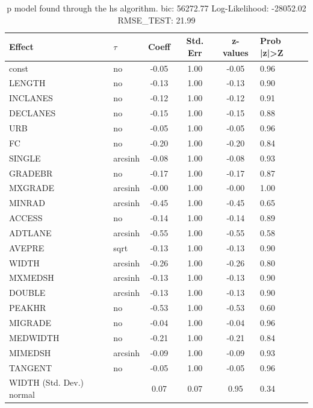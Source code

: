 \begin{table}
	\caption{p model found through the hs algorithm. bic: 56272.77 Log-Likelihood: -28052.02 RMSE_TEST: 21.99}
	\begin{center}
		\begin{tabular}{|l|l|c|c|c|l|}
			\hline
			Effect & $\tau$ & Coeff & Std. Err & z-values & Prob |z|>Z \\
			\hline
			const & no & -0.05 & 1.00 & -0.05 & 0.96 \\
			\hline
			LENGTH & no & -0.13 & 1.00 & -0.13 & 0.90 \\
			\hline
			INCLANES & no & -0.12 & 1.00 & -0.12 & 0.91 \\
			\hline
			DECLANES & no & -0.15 & 1.00 & -0.15 & 0.88 \\
			\hline
			URB & no & -0.05 & 1.00 & -0.05 & 0.96 \\
			\hline
			FC & no & -0.20 & 1.00 & -0.20 & 0.84 \\
			\hline
			SINGLE & arcsinh & -0.08 & 1.00 & -0.08 & 0.93 \\
			\hline
			GRADEBR & no & -0.17 & 1.00 & -0.17 & 0.87 \\
			\hline
			MXGRADE & arcsinh & -0.00 & 1.00 & -0.00 & 1.00 \\
			\hline
			MINRAD & arcsinh & -0.45 & 1.00 & -0.45 & 0.65 \\
			\hline
			ACCESS & no & -0.14 & 1.00 & -0.14 & 0.89 \\
			\hline
			ADTLANE & arcsinh & -0.55 & 1.00 & -0.55 & 0.58 \\
			\hline
			AVEPRE & sqrt & -0.13 & 1.00 & -0.13 & 0.90 \\
			\hline
			WIDTH & arcsinh & -0.26 & 1.00 & -0.26 & 0.80 \\
			\hline
			MXMEDSH & arcsinh & -0.13 & 1.00 & -0.13 & 0.90 \\
			\hline
			DOUBLE & arcsinh & -0.13 & 1.00 & -0.13 & 0.90 \\
			\hline
			PEAKHR & no & -0.53 & 1.00 & -0.53 & 0.60 \\
			\hline
			MIGRADE & no & -0.04 & 1.00 & -0.04 & 0.96 \\
			\hline
			MEDWIDTH & no & -0.21 & 1.00 & -0.21 & 0.84 \\
			\hline
			MIMEDSH & arcsinh & -0.09 & 1.00 & -0.09 & 0.93 \\
			\hline
			TANGENT & no & -0.05 & 1.00 & -0.05 & 0.96 \\
			\hline
			WIDTH (Std. Dev.) normal &  & 0.07 & 0.07 & 0.95 & 0.34 \\

\end{tabular}
\end{center}
\end{table}
